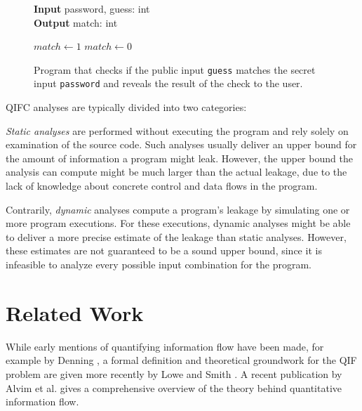 \begin{figure}
\centering
\begin{minipage}{.7\linewidth}
    \begin{algorithm}[H]
        \hspace*{\algorithmicindent} \textbf{Input} password, guess: int \\
        \hspace*{\algorithmicindent} \textbf{Output} match: int
        \begin{algorithmic}[1]
                \State $match \leftarrow 1$
            \Else
                \State $match \leftarrow 0$
            \EndIf
    \end{algorithmic} 
    \end{algorithm}
    \end{minipage}
    \caption{Program that checks if the public input \texttt{guess} matches the secret input \texttt{password} and reveals the result of the check to the user.}
    \label{fig:pwChecker}
\end{figure}

QIFC analyses are typically divided into two categories:

\emph{Static analyses} are performed without executing the program and rely solely on examination of the source code. Such analyses usually deliver an upper bound for the amount of information a program might leak. However, the upper bound the analysis can compute might be much larger than the actual leakage, due to the lack of knowledge about concrete control and data flows in the program.

Contrarily, \emph{dynamic} analyses compute a program's leakage by simulating one or more program executions. For these executions, dynamic analyses might be able to deliver a more precise estimate of the leakage than static analyses. However, these estimates are not guaranteed to be a sound upper bound, since it is infeasible to analyze every possible input combination for the program.

\section{Related Work}\label{sec:relWork}

While early mentions of quantifying information flow have been made, for example by Denning \cite{denning82}, a formal definition and theoretical groundwork for the QIF problem are given more recently by Lowe \cite{lowe02} and Smith \cite{smith09}. A recent publication by Alvim et al. \cite{alvim19} gives a comprehensive overview of the theory behind quantitative information flow.

